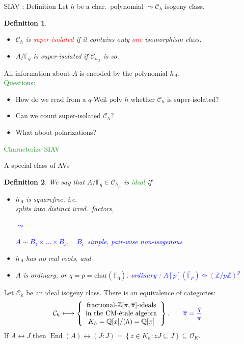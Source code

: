 \documentclass[usenames,dvipsnames,handout]{beamer}
\def\Q{\mathbb{Q}}
\def\Z{\mathbb{Z}}
\def\F{\mathbb{F}}
\DeclareMathOperator{\End}{End}
\newcommand{\cC}{{\mathcal C}}
\newcommand{\cO}{{\mathcal O}}
\newcommand{\set}[1]{\left\lbrace#1\right\rbrace }
\newcommand{\red}[1]{\textcolor{red}{#1}}
\newcommand{\blue}[1]{\textcolor{blue}{#1}}
\newcommand{\green}[1]{\textcolor{ForestGreen}{#1}}
\newtheorem{df}{Definition}[section]
\begin{document}
\begin{frame}{ SIAV : Definition }
    Let $h$ be a char.~polynomial $\leadsto \cC_h$ isogeny class.
    \pause
    \begin{df}
        \begin{itemize}
	     \item $\cC_h$ is \red{super-isolated} if it contains only \red{one} isomorphism class.
	     \item $A/\F_q$ is super-isolated if $\cC_{h_A}$ is so.
	    \end{itemize}
	\end{df}
    \pause
    All information about $A$ is encoded by the polynomial $h_A$.\\
    \pause
    \green{Questions}:
    \begin{itemize}
	 \item How do we read from a $q$-Weil poly $h$ whether $\cC_h$ is super-isolated?
	 \item Can we count super-isolated $\cC_h$?
	 \item What about polarizations?
	\end{itemize}
\end{frame}

\begin{frame}{ }
    \begin{center}
    \green{\huge Characterize SIAV}
    \end{center}
\end{frame}

\begin{frame}{ A special class of AVs }
    \begin{df}
    We say that $A/\F_q \in \cC_{h_A}$ is \green{ideal} if
    	\begin{itemize}
    	 \pause\item \parbox{5.5cm}{ $h_A$ is squarefree, i.e.\\ splits into distinct irred.~factors,}\quad \blue{ $\leadsto$~\parbox{4.8cm}{\centering $A\sim B_1\times \ldots\times B_s,\quad B_i$~simple, pair-wise non-isogenous}}
    	 \pause\item $h_A$ has no real roots, and
    	 \pause \item $A$ is ordinary, or $q=p=\mathrm{char(\F_q)}$. \blue{\qquad ordinary : $A[p](\overline{\F}_p)\simeq (\Z/p\Z)^g$}
    	\end{itemize}
	\end{df}
	\pause
	\begin{theorem}
	Let $\cC_{h}$ be an ideal isogeny class. There is an equivalence of categories:
    \pause	
	\[ \cC_{h} \longleftrightarrow \set{ \parbox{4cm}{\centering fractional-$\Z[\pi,\overline{\pi}]$-ideals\\ in the CM-\'etale algebra $K_{h}=\Q[x]/(h)=\Q[\pi]$} }.  
	\blue{\qquad \overline{\pi}=\frac{q}{\pi}}  \]
    \pause	
	If $A \leftrightarrow J$ then $\End(A) \leftrightarrow (J:J)=\set{ z \in K_{h} : zJ\subseteq J}\subseteq \cO_K $.
	\end{theorem}
\end{frame}
\end{document}
